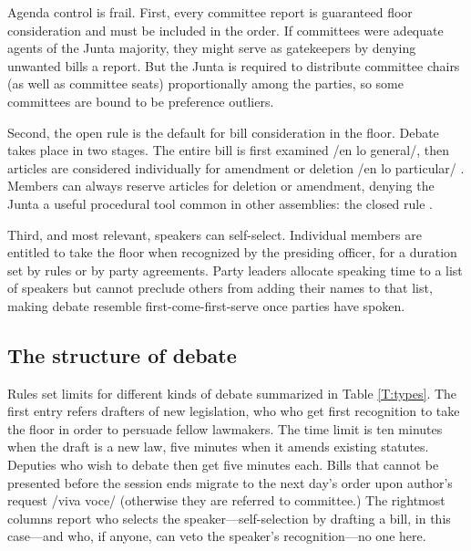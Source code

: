 \documentclass[letter,12pt]{article}
\begin{document}
Agenda control is frail. First, every committee report is guaranteed floor consideration and must be included in the order. If committees were adequate agents of the Junta majority, they might serve as gatekeepers by denying unwanted bills a report. But the Junta is required to distribute committee chairs (as well as committee seats) proportionally among the parties, so some committees are bound to be preference outliers.

Second, the open rule is the default for bill consideration in the floor. Debate takes place in two stages. The entire bill is first examined /en lo general/, then articles are considered individually for amendment or deletion /en lo particular/ \citep[see][]{heller.weldon.nd}. Members can always reserve articles for deletion or amendment, denying the Junta a useful procedural tool common in other assemblies: the closed rule \citep[eg.,][]{cox.2006,weingast.1992,magar-palanza-sin-Pdt-fast-track-chile-2021jop}.

Third, and most relevant, speakers can self-select. Individual members are entitled to take the floor when recognized by the presiding officer, for a duration set by rules or by party agreements. Party leaders allocate speaking time to a list of speakers but cannot preclude others from adding their names to that list, making debate resemble first-come-first-serve once parties have spoken. 


  \subsection{The structure of debate}
Rules set limits for different kinds of debate summarized in Table \ref{T:types}. The first entry refers drafters of new legislation, who who get first recognition to take the floor in order to persuade fellow lawmakers. The time limit is ten minutes when the draft is a new law, five minutes when it amends existing statutes. Deputies who wish to debate then get five minutes each. Bills that cannot be presented before the session ends migrate to the next day's order upon author's request /viva voce/ (otherwise they are referred to committee.) The rightmost columns report who selects the speaker---self-selection by drafting a bill, in this case---and who, if anyone, can veto the speaker's recognition---no one here. 
\end{document}
